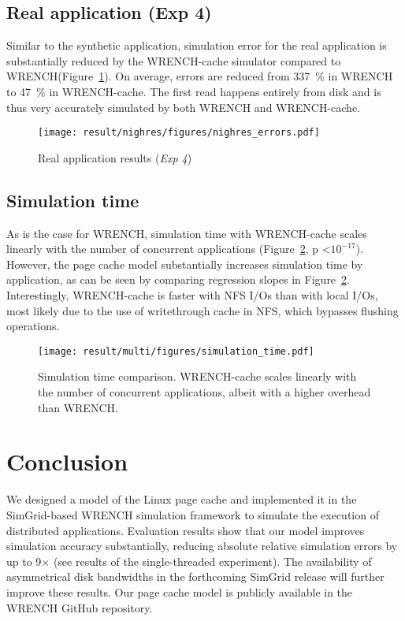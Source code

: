 \documentclass[conference]{IEEEtran}
\newcommand{\simgrid}{SimGrid\xspace}
\newcommand{\wrench}{WRENCH\xspace}
\begin{document}
        \subsection{Real application (Exp 4)}

        Similar to the synthetic application, simulation error for the real application is
        substantially reduced by the \wrench-cache simulator compared to
        \wrench (Figure~\ref{fig:nighres}). On average, errors are reduced
        from 337~\% in \wrench to 47~\% in \wrench-cache. 
        The first read happens entirely from disk and is thus 
        very accurately simulated by both \wrench and \wrench-cache.
    
        \begin{figure}[b]
                \centering
                \texttt{[image: result/nighres/figures/nighres\_errors.pdf]}
            \caption{Real application results (\textit{Exp 4})}
            \label{fig:nighres}
            \end{figure}

        \subsection{Simulation time}

        As is the case for \wrench, simulation time with \wrench-cache scales
        linearly with the number of concurrent applications
        (Figure~\ref{fig:multi_time}, p \textless $10^{-17}$). However, the page
        cache model substantially increases simulation time by
        application, as can be seen by comparing regression slopes in
        Figure~\ref{fig:multi_time}. Interestingly, \wrench-cache is faster with 
        NFS I/Os than with local I/Os, most likely due to the use of writethrough
        cache in NFS, which bypasses flushing operations.

        \begin{figure}
            \centering
            \texttt{[image: result/multi/figures/simulation\_time.pdf]}
            \caption{Simulation time comparison. \wrench-cache scales
            linearly with the number of concurrent applications, albeit
            with a higher overhead than \wrench.}
            \label{fig:multi_time}
            \end{figure}

    \section{Conclusion}
    \label{discussion}
    We designed a model of the Linux page cache and implemented it in the
    \simgrid-based \wrench simulation framework to simulate the execution
    of distributed applications.
    Evaluation results show that our model improves simulation accuracy
    substantially, reducing absolute relative simulation errors by up to
    9$\times$ (see results of the single-threaded experiment). The
    availability of asymmetrical disk bandwidths in the forthcoming
    \simgrid release will further improve these results.
    Our page cache model is publicly available in the \wrench GitHub
    repository.
\end{document}
